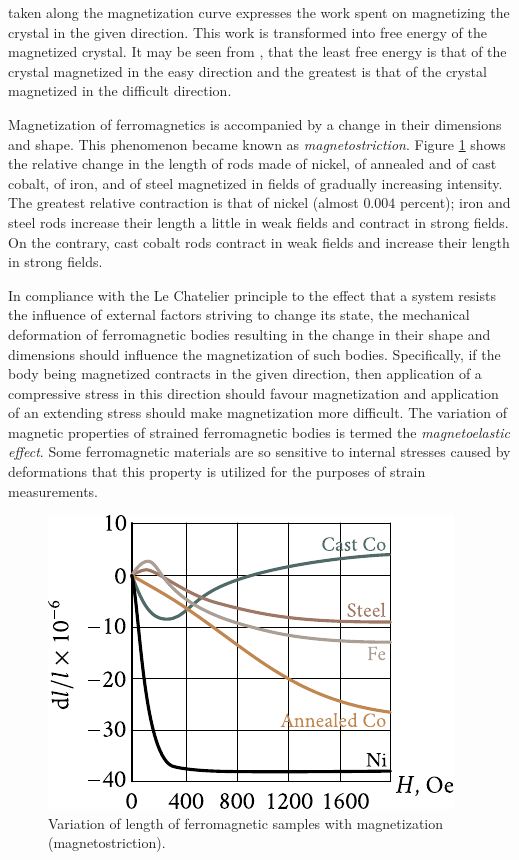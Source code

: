 \noindent
taken along the magnetization curve expresses the work spent on magnetizing the crystal in the given direction. This work is transformed into free energy of the magnetized crystal. It may be seen from , that the least free energy is that of the crystal magnetized in the easy direction and the greatest is that of the crystal magnetized in the difficult direction.

Magnetization of ferromagnetics is accompanied by a change in their dimensions and shape. This phenomenon became known as \textit{magnetostriction}. Figure \ref{fig:7_7} shows the relative change in the length of rods made of nickel, of annealed and of cast cobalt, of iron, and of steel magnetized in fields of gradually increasing intensity. The greatest relative contraction is that of nickel (almost $0.004$ percent); iron and steel rods increase their length a little in weak fields and contract in strong fields. On the contrary, cast cobalt rods contract in weak fields and increase their length in strong fields.

In compliance with the Le Chatelier principle to the effect that a system resists the influence of external factors striving to change its state, the mechanical deformation of ferromagnetic bodies resulting in the change in their shape and dimensions should influence the magnetization of such bodies. Specifically, if the body being magnetized contracts in the given direction, then application of a compressive stress in this direction should favour magnetization and application of an extending stress should make magnetization more difficult. The variation of magnetic properties of strained ferromagnetic bodies is termed the \textit{magnetoelastic effect}. Some ferromagnetic materials are so sensitive to internal stresses caused by deformations that this property is utilized for the purposes of strain measurements.

\begin{figure}[t]
	\begin{center}
		\includegraphics[scale=1]{figures/ch_07/fig_7_7.pdf}
		\caption[]{Variation of length of ferromagnetic samples with magnetization (magnetostriction).}
		\label{fig:7_7}
	\end{center}
	\vspace{-0.7cm}
\end{figure}

